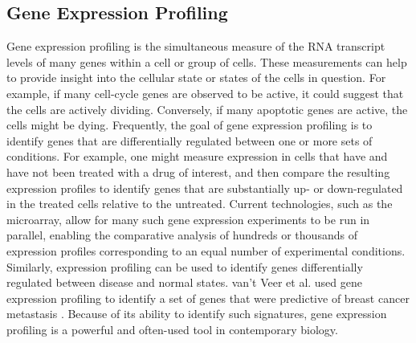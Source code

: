 \documentclass[12pt]{article}
\begin{document}


\subsection{Gene Expression Profiling}

Gene expression profiling is the simultaneous measure of the RNA transcript levels of many genes within a cell or group of cells. These measurements can help to provide insight into the cellular state or states of the cells in question. For example, if many cell-cycle genes are observed to be active, it could suggest that the cells are actively dividing. Conversely, if many apoptotic genes are active, the cells might be dying. Frequently, the goal of gene expression profiling is to identify genes that are differentially regulated between one or more sets of conditions. For example, one might measure expression in cells that have and have not been treated with a drug of interest, and then compare the resulting expression profiles to identify genes that are substantially up- or down-regulated in the treated cells relative to the untreated. Current technologies, such as the microarray, allow for many such gene expression experiments to be run in parallel, enabling the comparative analysis of hundreds or thousands of expression profiles corresponding to an equal number of experimental conditions. Similarly, expression profiling can be used to identify genes differentially regulated between disease and normal states. van't Veer et al. used gene expression profiling to identify a set of genes that were predictive of breast cancer metastasis \cite{van_t_veer_gene_2002}. Because of its ability to identify such signatures, gene expression profiling is a powerful and often-used tool in contemporary biology.
\end{document}
